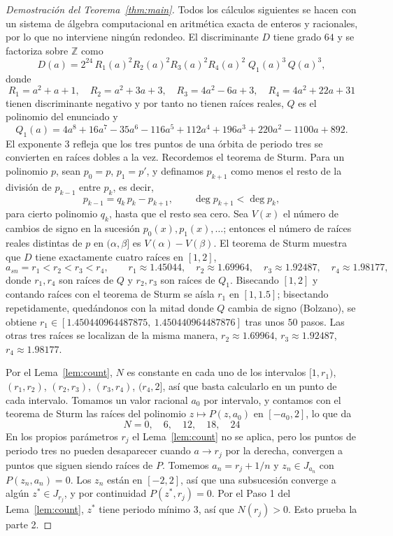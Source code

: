 \documentclass[12pt,a4paper]{report}
\theoremstyle{definition}
\begin{document}
\begin{proof}[Demostración del Teorema~\ref{thm:main}]
Todos los cálculos siguientes se hacen con un sistema de álgebra computacional en aritmética exacta de enteros y racionales, por lo que no interviene ningún redondeo. El discriminante $D$ tiene grado $64$ y se factoriza sobre $\mathbb{Z}$ como
\[
D(a) = 2^{24}\, R_1(a)^2R_2(a)^2R_3(a)^2R_4(a)^2\; Q_1(a)^3\, Q(a)^3 ,
\]
donde
\[
R_1 = a^2+a+1,\quad R_2 = a^2+3a+3,\quad R_3 = 4a^2-6a+3,\quad R_4 = 4a^2+22a+31
\]
tienen discriminante negativo y por tanto no tienen raíces reales, $Q$ es el polinomio del enunciado y
\[
Q_1(a) = 4a^8 + 16a^7 - 35a^6 - 116a^5 + 112a^4 + 196a^3 + 220a^2 - 1100a + 892 .
\]
El exponente $3$ refleja que los tres puntos de una órbita de periodo tres se convierten en raíces dobles a la vez. Recordemos el teorema de Sturm. Para un polinomio $p$, sean $p_0=p$, $p_1=p'$, y definamos $p_{k+1}$ como menos el resto de la división de $p_{k-1}$ entre $p_k$, es decir,
\[
p_{k-1} = q_k\,p_k - p_{k+1}, \qquad \deg p_{k+1} < \deg p_k ,
\]
para cierto polinomio $q_k$, hasta que el resto sea cero. Sea $V(x)$ el número de cambios de signo en la sucesión $p_0(x),p_1(x),\dots$; entonces el número de raíces reales distintas de $p$ en $(\alpha,\beta]$ es $V(\alpha)-V(\beta)$. El teorema de Sturm muestra que $D$ tiene exactamente cuatro raíces en $[1,2]$,
\[
a_{sn}=r_1 < r_2 < r_3 < r_4, \qquad r_1\approx1.45044,\quad r_2\approx 1.69964,\quad r_3\approx 1.92487,\quad r_4\approx 1.98177,
\]
donde $r_1,r_4$ son raíces de $Q$ y $r_2,r_3$ son raíces de $Q_1$. Bisecando $[1,2]$ y contando raíces con el teorema de Sturm se aísla $r_1$ en $[1,1.5]$; bisectando repetidamente, quedándonos con la mitad donde $Q$ cambia de signo (Bolzano), se obtiene $r_1\in[1.450440964487875,\ 1.450440964487876]$ tras unos $50$ pasos. Las otras tres raíces se localizan de la misma manera, $r_2\approx 1.69964$, $r_3\approx 1.92487$, $r_4\approx 1.98177$.

Por el Lema~\ref{lem:count}, $N$ es constante en cada uno de los intervalos $[1,r_1)$, $(r_1,r_2)$, $(r_2,r_3)$, $(r_3,r_4)$, $(r_4,2]$, así que basta calcularlo en un punto de cada intervalo. Tomamos un valor racional $a_0$ por intervalo, y contamos con el teorema de Sturm las raíces del polinomio $z\mapsto P(z,a_0)$ en $[-a_0,2]$, lo que da
\[
N = 0,\quad 6,\quad 12,\quad 18,\quad 24
\]
En los propios parámetros $r_j$ el Lema~\ref{lem:count} no se aplica, pero los puntos de periodo tres no pueden desaparecer cuando $a\to r_j$ por la derecha, convergen a puntos que siguen siendo raíces de $P$. Tomemos $a_n = r_j + 1/n$ y $z_n\in J_{a_n}$ con $P(z_n,a_n)=0$. Los $z_n$ están en $[-2,2]$, así que una subsucesión converge a algún $z^*\in J_{r_j}$, y por continuidad $P(z^*,r_j)=0$. Por el Paso 1 del Lema~\ref{lem:count}, $z^*$ tiene periodo mínimo $3$, así que $N(r_j)>0$. Esto prueba la parte 2.


\end{proof}
\end{document}
